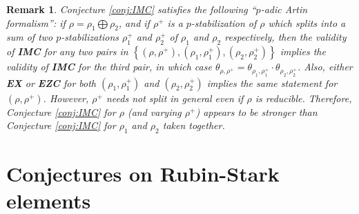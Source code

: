 \documentclass[12pt]{amsart}
\theoremstyle{defstyle}
\newtheorem{remark}[subsubsection]{Remark}
\theoremstyle{thmstyle}
\begin{document}
\begin{remark}\label{rem:p_adic_artin_formalism}
	Conjecture \ref{conj:IMC} satisfies the following ``$p$-adic Artin formalism'': if $\rho=\rho_1\bigoplus\rho_2$, and if $\rho^+$ is a $p$-stabilization of $\rho$ which splits into a sum of two $p$-stabilizations $\rho_1^+$ and $\rho_2^+$ of $\rho_1$ and $\rho_2$ respectively, then the validity of \textbf{IMC} for any two pairs in $\left\{(\rho,\rho^+),(\rho_1,\rho_1^+),(\rho_2,\rho_2^+)\right\}$ implies the validity of \textbf{IMC} for the third pair, in which case $\theta_{\rho,\rho^+}=\theta_{\rho_1,\rho_1^+}\cdot\theta_{\rho_2,\rho_2^+}$. Also, either \textbf{EX} or \textbf{EZC} for both $(\rho_1,\rho_1^+)$ and $(\rho_2,\rho_2^+)$ implies the same statement for $(\rho,\rho^+)$. However, $\rho^+$ needs not split in general even if $\rho$ is reducible. Therefore, Conjecture \ref{conj:IMC} for $\rho$ (and varying $\rho^+$) appears to be stronger than Conjecture \ref{conj:IMC} for $\rho_1$ and $\rho_2$ taken together.
\end{remark}

\section{Conjectures on Rubin-Stark elements}\label{sec:conjectures_on_RS_elts}
\end{document}
